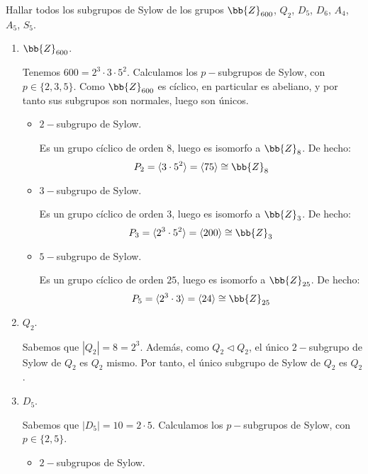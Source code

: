 \begin{ejercicio}\label{ej:6.21}
    Hallar todos los subgrupos de Sylow de los grupos $\bb{Z}_{600}$, $Q_2$, $D_5$, $D_6$, $A_4$, $A_5$, $S_5$.
    \begin{enumerate}
        \item $\bb{Z}_{600}$.
        
        Tenemos $600=2^3\cdot 3\cdot 5^2$. Calculamos los $p-$subgrupos de Sylow, con $p\in \{2,3,5\}$. Como $\bb{Z}_{600}$ es cíclico, en particular es abeliano, y por tanto sus subgrupos son normales, luego son únicos.
        \begin{itemize}
            \item $2-$subgrupo de Sylow.
            
            Es un grupo cíclico de orden $8$, luego es isomorfo a $\bb{Z}_8$. De hecho:
            \begin{equation*}
                P_2 = \langle 3\cdot 5^2 \rangle = \langle 75 \rangle \cong \bb{Z}_8
            \end{equation*}

            \item $3-$subgrupo de Sylow.
            
            Es un grupo cíclico de orden $3$, luego es isomorfo a $\bb{Z}_3$. De hecho:
            \begin{equation*}
                P_3 = \langle 2^3\cdot 5^2 \rangle = \langle 200 \rangle \cong \bb{Z}_3
            \end{equation*}
            \item $5-$subgrupo de Sylow.
            
            Es un grupo cíclico de orden $25$, luego es isomorfo a $\bb{Z}_{25}$. De hecho:
            \begin{equation*}
                P_5 = \langle 2^3\cdot 3 \rangle = \langle 24 \rangle \cong \bb{Z}_{25}
            \end{equation*}
        \end{itemize}

        \item $Q_2$.
        
        Sabemos que $|Q_2|=8=2^3$. Además, como $Q_2\lhd Q_2$, el único $2-$subgrupo de Sylow de $Q_2$ es $Q_2$ mismo. Por tanto, el único subgrupo de Sylow de $Q_2$ es $Q_2$.

        \item $D_5$.
        
        Sabemos que $|D_5|=10=2\cdot 5$. Calculamos los $p-$subgrupos de Sylow, con $p\in \{2,5\}$.
        \begin{itemize}
            \item $2-$subgrupos de Sylow.
            

\end{itemize}
\end{enumerate}
\end{ejercicio}
